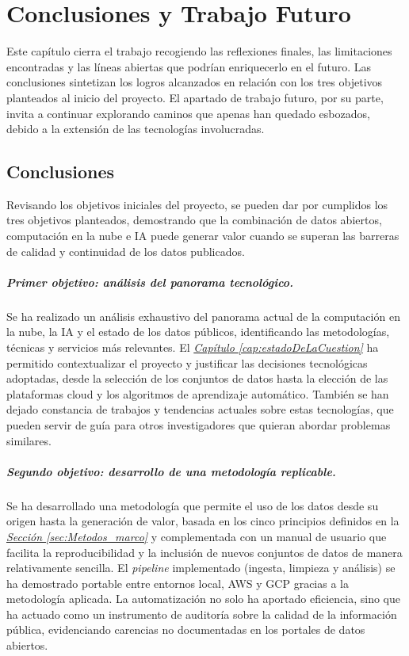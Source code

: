 \chapter{Conclusiones y Trabajo Futuro}
\label{cap:conclusiones}

Este capítulo cierra el trabajo recogiendo las reflexiones finales, las limitaciones encontradas y las líneas abiertas que podrían enriquecerlo en el futuro. Las conclusiones sintetizan los logros alcanzados en relación con los tres objetivos planteados al inicio del proyecto. El apartado de trabajo futuro, por su parte, invita a continuar explorando caminos que apenas han quedado esbozados, debido a la extensión de las tecnologías involucradas.

\section{Conclusiones}
\label{sec:conclusiones}

Revisando los objetivos iniciales del proyecto, se pueden dar por cumplidos los tres objetivos planteados, demostrando que la combinación de datos abiertos, computación en la nube e IA puede generar valor cuando se superan las barreras de calidad y continuidad de los datos publicados.

\paragraph{Primer objetivo: análisis del panorama tecnológico.}
Se ha realizado un análisis exhaustivo del panorama actual de la computación en la nube, la IA y el estado de los datos públicos, identificando las metodologías, técnicas y servicios más relevantes. El \hyperref[cap:estadoDeLaCuestion]{\textit{Capítulo \ref*{cap:estadoDeLaCuestion}}} ha permitido contextualizar el proyecto y justificar las decisiones tecnológicas adoptadas, desde la selección de los conjuntos de datos hasta la elección de las plataformas cloud y los algoritmos de aprendizaje automático. También se han dejado constancia de trabajos y tendencias actuales sobre estas tecnologías, que pueden servir de guía para otros investigadores que quieran abordar problemas similares.

\paragraph{Segundo objetivo: desarrollo de una metodología replicable.}
Se ha desarrollado una metodología que permite el uso de los datos desde su origen hasta la generación de valor, basada en los cinco principios definidos en la \hyperref[sec:Metodos_marco]{\textit{Sección \ref*{sec:Metodos_marco}}} y complementada con un manual de usuario que facilita la reproducibilidad y la inclusión de nuevos conjuntos de datos de manera relativamente sencilla. El \textit{pipeline} implementado (ingesta, limpieza y análisis) se ha demostrado portable entre entornos local, AWS y GCP gracias a la metodología aplicada. La automatización no solo ha aportado eficiencia, sino que ha actuado como un instrumento de auditoría sobre la calidad de la información pública, evidenciando carencias no documentadas en los portales de datos abiertos.

